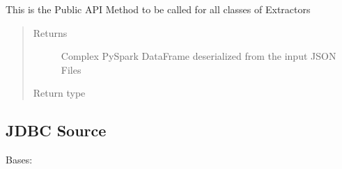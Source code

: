 \documentclass[a4paper,10pt, twoside,english]{sphinxmanual}
\begin{document}
\begin{fulllineitems}
\begin{fulllineitems}
\label{\detokenize{extractor/json:spooq2.extractor.json_files.JSONExtractor.extract}}
This is the Public API Method to be called for all classes of Extractors
\begin{quote}\begin{description}
\item[{Returns}] \leavevmode
Complex PySpark DataFrame deserialized from the input JSON Files

\item[{Return type}] \leavevmode
{}

\end{description}\end{quote}

\end{fulllineitems}


\end{fulllineitems}



\subsection{JDBC Source}
\label{\detokenize{extractor/jdbc:module-spooq2.extractor.jdbc}}\label{\detokenize{extractor/jdbc:jdbc-source}}\label{\detokenize{extractor/jdbc::doc}}

\begin{fulllineitems}
\label{\detokenize{extractor/jdbc:spooq2.extractor.jdbc.JDBCExtractor}}
Bases: {\hyperref[\detokenize{base_classes/extractor:spooq2.extractor.extractor.Extractor}]{}}

\end{fulllineitems}

\end{document}
